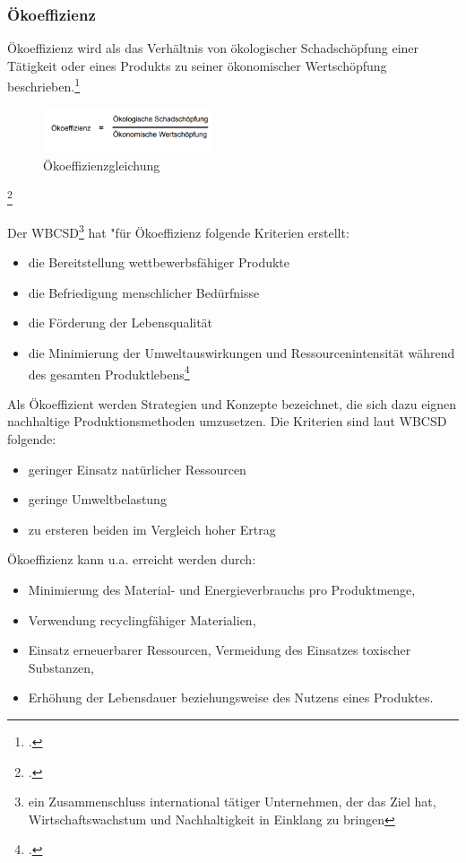 \documentclass{scrartcl}
\begin{document}
\subsubsection{Ökoeffizienz}
Ökoeffizienz wird als das Verhältnis von ökologischer Schadschöpfung einer Tätigkeit oder eines Produkts zu seiner ökonomischer Wertschöpfung beschrieben.\footcite{ vgl. Schaltegger1990OkologischeUnternehmung} 

\begin{figure}[h]
\centering
\includegraphics[width=5cm]{image_folder/oekoeffizienz.png}
\caption{Ökoeffizienzgleichung}
\label{fig:Ökoeffizienzgleichung}
\end{figure}\footcite{Essel2010AnalyseFazit}

   
 Der WBCSD\footnote{ein Zusammenschluss international tätiger Unternehmen, der das Ziel hat, Wirtschaftswachstum und Nachhaltigkeit in Einklang zu bringen} hat "für Ökoeffizienz folgende Kriterien erstellt: 
 
 \begin{itemize}
 \item die Bereitstellung wettbewerbsfähiger Produkte
 \item die Befriedigung menschlicher Bedürfnisse 
 \item die Förderung der Lebensqualität
 \item die Minimierung der Umweltauswirkungen und Ressourcenintensität während des gesamten Produktlebens\footcite{OkoeffizienzBrockhaus.de}
 \end{itemize}

Als Ökoeffizient werden Strategien und Konzepte bezeichnet, die sich dazu eignen nachhaltige Produktionsmethoden umzusetzen. Die Kriterien sind laut WBCSD folgende:
\begin{itemize}
\item geringer Einsatz natürlicher Ressourcen
\item geringe Umweltbelastung
\item zu ersteren beiden im Vergleich hoher Ertrag
\end{itemize}


Ökoeffizienz kann u.a. erreicht werden durch:
\begin{itemize}
\item Minimierung des Material- und Energieverbrauchs pro Produktmenge,
\item Verwendung recyclingfähiger Materialien,
\item Einsatz erneuerbarer Ressourcen, Vermeidung des Einsatzes toxischer Substanzen,
\item Erhöhung der Lebensdauer beziehungsweise des Nutzens eines Produktes.
\end{itemize}
\end{document}
